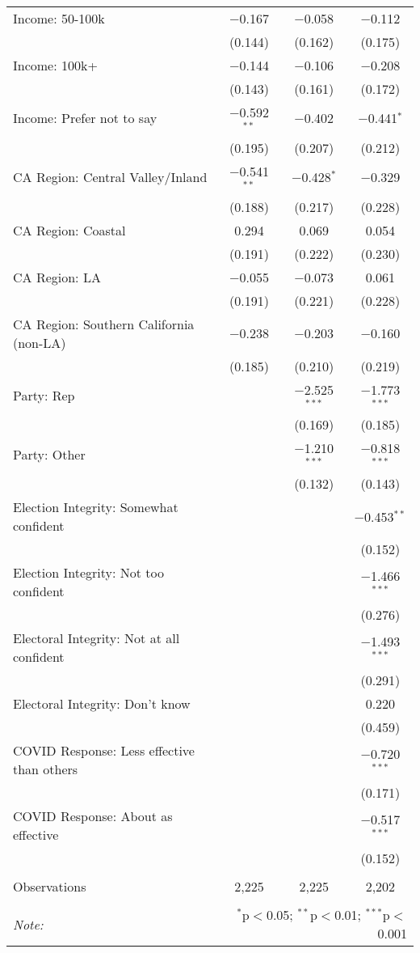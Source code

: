 \begin{table}[!htbp]
\begin{tabular}{@{\extracolsep{5pt}}lccc}
  Income: 50-100k & $-$0.167 & $-$0.058 & $-$0.112 \\ 
  & (0.144) & (0.162) & (0.175) \\ 
  Income: 100k+ & $-$0.144 & $-$0.106 & $-$0.208 \\ 
  & (0.143) & (0.161) & (0.172) \\ 
  Income: Prefer not to say & $-$0.592$^{**}$ & $-$0.402 & $-$0.441$^{*}$ \\ 
  & (0.195) & (0.207) & (0.212) \\ 
  CA Region: Central Valley/Inland & $-$0.541$^{**}$ & $-$0.428$^{*}$ & $-$0.329 \\ 
  & (0.188) & (0.217) & (0.228) \\ 
  CA Region: Coastal & 0.294 & 0.069 & 0.054 \\ 
  & (0.191) & (0.222) & (0.230) \\ 
  CA Region: LA & $-$0.055 & $-$0.073 & 0.061 \\ 
  & (0.191) & (0.221) & (0.228) \\ 
  CA Region: Southern California (non-LA) & $-$0.238 & $-$0.203 & $-$0.160 \\ 
  & (0.185) & (0.210) & (0.219) \\ 
  Party: Rep &  & $-$2.525$^{***}$ & $-$1.773$^{***}$ \\ 
  &  & (0.169) & (0.185) \\ 
  Party: Other &  & $-$1.210$^{***}$ & $-$0.818$^{***}$ \\ 
  &  & (0.132) & (0.143) \\ 
  Election Integrity: Somewhat confident &  &  & $-$0.453$^{**}$ \\ 
  &  &  & (0.152) \\ 
  Election Integrity: Not too confident &  &  & $-$1.466$^{***}$ \\ 
  &  &  & (0.276) \\ 
  Electoral Integrity: Not at all confident &  &  & $-$1.493$^{***}$ \\ 
  &  &  & (0.291) \\ 
  Electoral Integrity: Don't know &  &  & 0.220 \\ 
  &  &  & (0.459) \\ 
  COVID Response: Less effective than others &  &  & $-$0.720$^{***}$ \\ 
  &  &  & (0.171) \\ 
  COVID Response: About as effective &  &  & $-$0.517$^{***}$ \\ 
  &  &  & (0.152) \\ 
 \hline \\[-1.8ex] 
Observations & 2,225 & 2,225 & 2,202 \\ 
\hline 
\hline \\[-1.8ex] 
\textit{Note:}  & \multicolumn{3}{r}{$^{*}$p$<$0.05; $^{**}$p$<$0.01; $^{***}$p$<$0.001} \\ 
\end{tabular} 
\end{table} 
